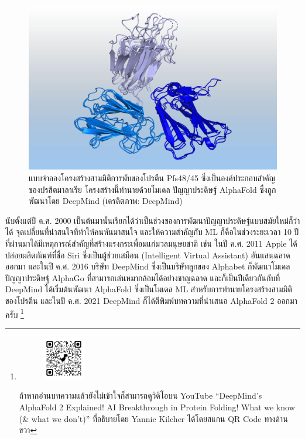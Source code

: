 \begin{figure}[H]
    \centering
    \includegraphics[width=\linewidth]{fig/malaria-parasite-protein-deepmind.jpeg}
    \caption{แบบจำลองโครงสร้างสามมิติการพับของโปรตีน Pfs48/45 ซึ่งเป็นองค์ประกอบสำคัญของปรสิตมาลาเรีย โครงสร้างนี้ทำนายด้วยโมเดล 
    ปัญญาประดิษฐ์ AlphaFold ซึ่งถูกพัฒนาโดย DeepMind (เครดิตภาพ: DeepMind)}
    \label{fig:malaria_parasite}
\end{figure}

นับตั้งแต่ปี ค.ศ. 2000 เป็นต้นมานั้นเรียกได้ว่าเป็นช่วงของการพัฒนาปัญญาประดิษฐ์แบบสมัยใหม่ก็ว่าได้ จุดเปลี่ยนที่น่าสนใจที่ทำให้คนหันมาสนใจ%
และให้ความสำคัญกับ ML ก็คือในช่วงระยะเวลา 10 ปีที่ผ่านมาได้มีเหตุการณ์สำคัญที่สร้างแรงกระเพื่อมแก่มวลมนุษยชาติ เช่น ในปี ค.ศ. 2011 
Apple ได้ปล่อยผลิตภัณฑ์ที่ชื่อ Siri ซึ่งเป็นผู้ช่วยเสมือน (Intelligent Virtual Assistant) อันแสนฉลาดออกมา และในปี ค.ศ. 2016 
บริษัท DeepMind ซึ่งเป็นบริษัทลูกของ Alphabet ก็พัฒนาโมเดลปัญญาประดิษฐ์ AlphaGo ที่สามารถเล่นหมากล้อมได้อย่างชาญฉลาด 
และก็เป็นปีเดียวกันกับที่ DeepMind ได้เริ่มต้นพัฒนา AlphaFold ซึ่งเป็นโมเดล ML สำหรับการทำนายโครงสร้างสามมิติของโปรตีน และในปี ค.ศ. 
2021 DeepMind ก็ได้ตีพิมพ์บทความที่นำเสนอ AlphaFold 2 ออกมาครับ\autocite{jumper2021} 
\footnote{
\setlength\intextsep{0pt}
\begin{figure}
        \centering
        \includegraphics[width=0.18\textwidth]{fig/qr_code_alphafold2_explained.png}
\end{figure}
ถ้าหากอ่านบทความแล้วยังไม่เข้าใจก็สามารถดูวิดีโอบน YouTube \enquote{DeepMind's AlphaFold 2 Explained! 
AI Breakthrough in Protein Folding! What we know (\& what we don't)} ที่อธิบายโดย Yannic Kilcher ได้โดยสแกน 
QR Code ทางด้านขวา}

